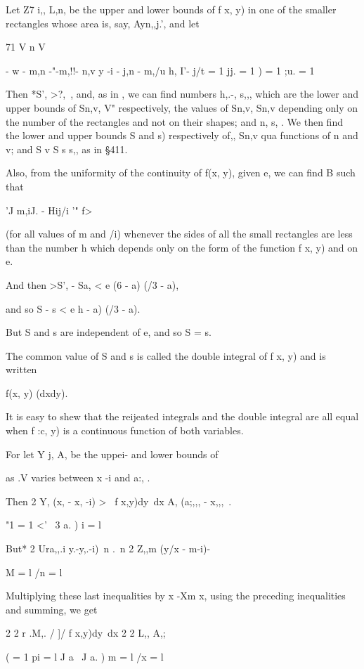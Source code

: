 Let Z7 i,, L,n, be the upper and lower bounds of f x, y) in one of
the smaller rectangles whose area is, say, Ayn,,j.', and let

71 V n V

- w - m,n -"-m,!!- n,v y -i - j,n - m,/u h, I'- j/t = 1 jj. = 1 ) = 1
;u. = 1

Then *S', >?, \,, and, as in , we can find numbers h,.-, s,,,
which are the lower and upper bounds of Sn,v, V" respectively, the
values of Sn,v, Sn,v depending only on the number of the rectangles
and not on their shapes; and n, s, . We then find the lower and upper
bounds S and s) respectively of,, Sn,v qua functions of n and v;
and S v S s s,, as in §411.

Also, from the uniformity of the continuity of f(x, y), given e, we
can find B such that

'J m,iJ. - Hij/i '" f>

(for all values of m and /i) whenever the sides of all the small
rectangles are less than the number h which depends only on the form
of the function f x, y) and on e.

And then >S', - Sa, < e (6 - a) (/3 - a),

and so S - s < e h - a) (/3 - a).

But S and s are independent of e, and so S = s.

The common value of S and s is called the double integral of f x, y)
and is written

f(x, y) (dxdy).

It is easy to shew that the reijeated integrals and the double
integral are all equal when f :c, y) is a continuous function of both
variables.

%
%

For let Y j, A, be the uppei- and lower bounds of

as .V varies between x -i and a:, .

Then 2 Y, (x, - x, -i) > \ f x,y)dy\ dx A, (a;,,, - x,,,\ .

"1 = 1 <' \ 3 a. ) i = l

But* 2 Ura,,.i y.-y,.-i) \,n .\ n 2 Z,,m (y/x - m-i)-

M = l /n = l

Multiplying these last inequalities by x -Xm x, using the preceding
inequalities and summing, we get

2 2 r .M,. / ]/ f x,y)dy\ dx 2 2 L,, A,;

 ( = 1 pi = l J a \ J a. ) m = l /x = l


